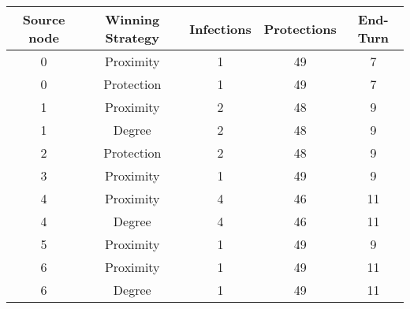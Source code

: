 \documentclass[results.tex]{subfiles}
\begin{document}
    \begin{center}
        \begin{tabular}{| c || c | c | c | c |}
            \hline
            {\bfseries Source node} & {\bfseries Winning Strategy} & {\bfseries Infections} & {\bfseries Protections}
            & {\bfseries End-Turn}
            \\  %
            \hline\hline
            0                       & Proximity                    & 1                      & 49                      & 7                    \\
            \hline
            0                       & Protection                   & 1                      & 49                      & 7                    \\
            \hline
            1                       & Proximity                    & 2                      & 48                      & 9                    \\
            \hline
            1                       & Degree                       & 2                      & 48                      & 9                    \\
            \hline
            2                       & Protection                   & 2                      & 48                      & 9                    \\
            \hline
            3                       & Proximity                    & 1                      & 49                      & 9                    \\
            \hline
            4                       & Proximity                    & 4                      & 46                      & 11                   \\
            \hline
            4                       & Degree                       & 4                      & 46                      & 11                   \\
            \hline
            5                       & Proximity                    & 1                      & 49                      & 9                    \\
            \hline
            6                       & Proximity                    & 1                      & 49                      & 11                   \\
            \hline
            6                       & Degree                       & 1                      & 49                      & 11                   \\

\end{tabular}
\end{center}
\end{document}
